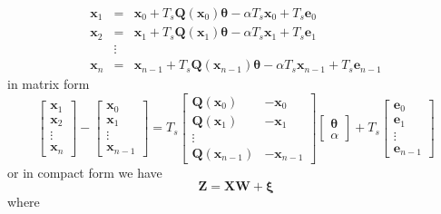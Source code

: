\documentclass[onecolumn,draftcls]{IEEEtran}
\begin{document}
\begin{eqnarray}
 \mathbf x_{1}&=&\mathbf x_{0}+T_s \mathbf Q(\mathbf x_0) \boldsymbol{\theta}-\alpha T_s\mathbf x_0+T_s\mathbf e_0 \nonumber \\
 \mathbf x_{2}&=&\mathbf x_{1}+T_s \mathbf Q(\mathbf x_1) \boldsymbol{\theta}-\alpha T_s\mathbf x_1+T_s\mathbf e_1\nonumber\\
&\vdots& \nonumber\\
 \mathbf x_{n}&=&\mathbf x_{n-1}+T_s \mathbf Q(\mathbf x_{n-1}) \boldsymbol{\theta}-\alpha T_s\mathbf x_{n-1}+T_s\mathbf e_{n-1}
\end{eqnarray}
in matrix form
\begin{equation}
 \begin{bmatrix} \mathbf x_{1}\\\mathbf x_{2}\\\vdots\\\mathbf x_{n}\end{bmatrix}-\begin{bmatrix} \mathbf x_{0}\\\mathbf x_{1}\\\vdots\\\mathbf x_{n-1}\end{bmatrix}=T_s\begin{bmatrix}\mathbf Q(\mathbf x_0)&-\mathbf x_{0}\\\mathbf Q(\mathbf x_1)&-\mathbf x_{1}\\\vdots\\ \mathbf Q(\mathbf x_{n-1})&-\mathbf x_{n-1}\end{bmatrix}\begin{bmatrix} \boldsymbol{\theta} \\ \alpha\end{bmatrix}+T_s\begin{bmatrix}\mathbf e_0\\\mathbf e_1\\\vdots\\\mathbf e_{n-1}\end{bmatrix}
\end{equation}
or in compact form we have
\begin{equation}
 \mathbf Z=\mathbf X \mathbf W+\boldsymbol \xi
\end{equation}
where
\end{document}
